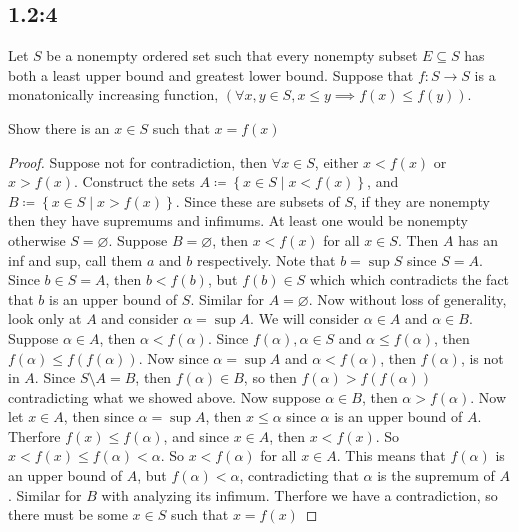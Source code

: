 \documentclass[11pt]{article}
\newenvironment{bp}{\color{blue}\begin{proof}}{\end{proof}}
\renewcommand{\subset}{\subseteq}
\let\null\varnothing
\begin{document}
\subsection*{1.2:4}
Let $S$ be a nonempty ordered set such that every nonempty subset $E\subset S$ has both a least upper bound and greatest lower bound. Suppose that $f: S\to S$ is a monatonically increasing function, $\left( \forall x, y\in S, x\leq y \implies f(x)\leq f(y) \right)$.

Show there is an $x\in S$ such that $x = f(x)$
\begin{bp}
  Suppose not for contradiction, then $\forall x\in S$, either $x < f(x)$ or $x > f(x)$. Construct the sets $A \coloneqq \left\{ x\in S\mid x < f(x) \right\}$, and $B\coloneqq \left\{ x\in S\mid x > f(x) \right\}$. Since these are subsets of $S$, if they are nonempty then they have supremums and infimums. At least one would be nonempty otherwise $S = \null$. Suppose $B = \null$, then $x < f(x)$ for all $x\in S$. Then $A$ has an inf and sup, call them $a$ and $b$ respectively. Note that $b = \sup S$ since $S = A$. Since $b\in S = A$, then $b < f(b)$, but $f(b)\in S$ which which contradicts the fact that $b$ is an upper bound of $S$. Similar for $A=\null$. Now without loss of generality, look only at $A$ and consider $\alpha = \sup A$. We will consider $\alpha\in A$ and $\alpha\in B$. Suppose $\alpha\in A$, then $\alpha < f(\alpha)$. Since $f(\alpha), \alpha\in S$ and $\alpha\leq f(\alpha)$, then $f(\alpha) \leq f(f(\alpha))$. Now since $\alpha = \sup A$ and $\alpha < f(\alpha)$, then $f(\alpha)$, is not in $A$. Since $S\setminus A = B$, then $f(\alpha)\in B$, so then $f(\alpha) > f(f(\alpha))$ contradicting what we showed above. Now suppose $\alpha\in B$, then $\alpha > f(\alpha)$. Now let $x\in A$, then since $\alpha = \sup A$, then $x \leq \alpha$ since $\alpha$ is an upper bound of $A$. Therfore $f(x) \leq f(\alpha)$, and since $x\in A$, then $x < f(x)$. So $x<f(x)\leq f(\alpha)<\alpha$. So $x < f(\alpha)$ for all $x \in A$. This means that $f(\alpha)$ is an upper bound of $A$, but $f(\alpha) < \alpha$, contradicting that $\alpha$ is the supremum of $A$. Similar for $B$ with analyzing its infimum. Therfore we have a contradiction, so there must be some $x\in S$ such that $x = f(x)$

\end{bp}
\end{document}
